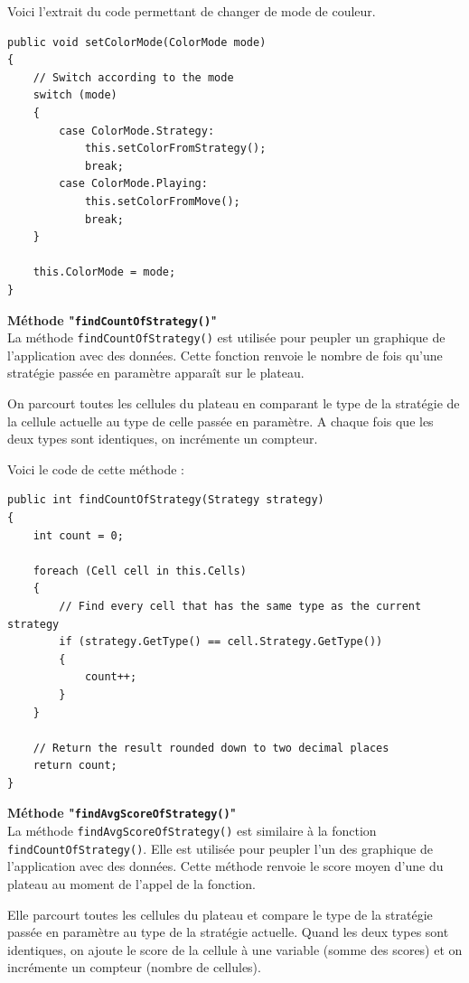 \documentclass[a4paper, french]{article}
\begin{document}
Voici l'extrait du code permettant de changer de mode de couleur.
\begin{lstlisting}
public void setColorMode(ColorMode mode)
{
    // Switch according to the mode
    switch (mode)
    {
        case ColorMode.Strategy:
            this.setColorFromStrategy();
            break;
        case ColorMode.Playing:
            this.setColorFromMove();
            break;
    }

    this.ColorMode = mode;
}
\end{lstlisting}


\textbf{Méthode "\texttt{findCountOfStrategy()}"}\\
La méthode \texttt{findCountOfStrategy()} est utilisée pour peupler un graphique de l'application avec des données. Cette fonction renvoie le nombre de fois qu'une stratégie passée en paramètre apparaît sur le plateau.

On parcourt toutes les cellules du plateau en comparant le type de la stratégie de la cellule actuelle au type de celle passée en paramètre. A chaque fois que les deux types sont identiques, on incrémente un compteur.

Voici le code de cette méthode :
\begin{lstlisting}
public int findCountOfStrategy(Strategy strategy)
{
    int count = 0;

    foreach (Cell cell in this.Cells)
    {
        // Find every cell that has the same type as the current strategy
        if (strategy.GetType() == cell.Strategy.GetType())
        {
            count++;
        }
    }

    // Return the result rounded down to two decimal places
    return count;
}
\end{lstlisting}

\pagebreak
\textbf{Méthode "\texttt{findAvgScoreOfStrategy()}"}\\
La méthode \texttt{findAvgScoreOfStrategy()} est similaire à la fonction \texttt{findCountOfStrategy()}. Elle est utilisée pour peupler l'un des graphique de l'application avec des données. Cette méthode renvoie le score moyen d'une du plateau au moment de l'appel de la fonction.

Elle parcourt toutes les cellules du plateau et compare le type de la stratégie passée en paramètre au type de la stratégie actuelle. Quand les deux types sont identiques, on ajoute le score de la cellule à une variable (somme des scores) et on incrémente un compteur (nombre de cellules).
\end{document}
